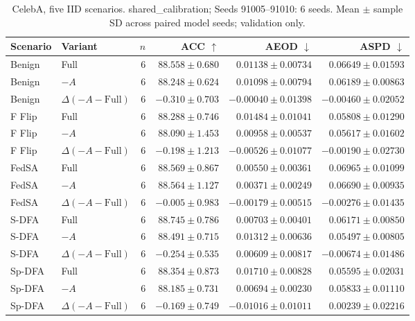 \begin{table}[t]
\centering
\small
\caption{CelebA, five IID scenarios. shared\_calibration; Seeds 91005–91010: 6 seeds. Mean $\pm$ sample SD across paired model seeds; validation only.}
\begin{tabular}{llrrrr}
\toprule
Scenario & Variant & $n$ & ACC $\uparrow$ & AEOD $\downarrow$ & ASPD $\downarrow$ \\
\midrule
Benign & Full & 6 & $88.558 \pm 0.680$ & $0.01138 \pm 0.00734$ & $0.06649 \pm 0.01593$ \\
Benign & $-A$ & 6 & $88.248 \pm 0.624$ & $0.01098 \pm 0.00794$ & $0.06189 \pm 0.00863$ \\
Benign & $\Delta(-A-\mathrm{Full})$ & 6 & $-0.310 \pm 0.703$ & $-0.00040 \pm 0.01398$ & $-0.00460 \pm 0.02052$ \\
F Flip & Full & 6 & $88.288 \pm 0.746$ & $0.01484 \pm 0.01041$ & $0.05808 \pm 0.01290$ \\
F Flip & $-A$ & 6 & $88.090 \pm 1.453$ & $0.00958 \pm 0.00537$ & $0.05617 \pm 0.01602$ \\
F Flip & $\Delta(-A-\mathrm{Full})$ & 6 & $-0.198 \pm 1.213$ & $-0.00526 \pm 0.01077$ & $-0.00190 \pm 0.02730$ \\
FedSA & Full & 6 & $88.569 \pm 0.867$ & $0.00550 \pm 0.00361$ & $0.06965 \pm 0.01099$ \\
FedSA & $-A$ & 6 & $88.564 \pm 1.127$ & $0.00371 \pm 0.00249$ & $0.06690 \pm 0.00935$ \\
FedSA & $\Delta(-A-\mathrm{Full})$ & 6 & $-0.005 \pm 0.983$ & $-0.00179 \pm 0.00515$ & $-0.00276 \pm 0.01435$ \\
S-DFA & Full & 6 & $88.745 \pm 0.786$ & $0.00703 \pm 0.00401$ & $0.06171 \pm 0.00850$ \\
S-DFA & $-A$ & 6 & $88.491 \pm 0.715$ & $0.01312 \pm 0.00636$ & $0.05497 \pm 0.00805$ \\
S-DFA & $\Delta(-A-\mathrm{Full})$ & 6 & $-0.254 \pm 0.535$ & $0.00609 \pm 0.00817$ & $-0.00674 \pm 0.01486$ \\
Sp-DFA & Full & 6 & $88.354 \pm 0.873$ & $0.01710 \pm 0.00828$ & $0.05595 \pm 0.02031$ \\
Sp-DFA & $-A$ & 6 & $88.185 \pm 0.731$ & $0.00694 \pm 0.00230$ & $0.05833 \pm 0.01110$ \\
Sp-DFA & $\Delta(-A-\mathrm{Full})$ & 6 & $-0.169 \pm 0.749$ & $-0.01016 \pm 0.01011$ & $0.00239 \pm 0.02216$ \\
\bottomrule
\end{tabular}
\end{table}

